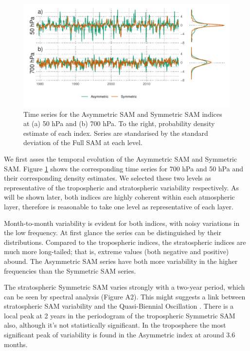 \documentclass[]{ametsocV5}
\begin{document}
\begin{figure}
\includegraphics{asymsam-timeseries-1} \caption[Time series for the Asymmetric SAM and Symmetric SAM indices at (a) 50 hPa and (b) 700 hPa]{Time series for the Asymmetric SAM and Symmetric SAM indices at (a) 50 hPa and (b) 700 hPa. To the right, probability density estimate of each index. Series are standarised by the standard deviation of the Full SAM at each level.}\label{fig:asymsam-timeseries}
\end{figure}

We first asses the temporal evolution of the Asymmetric SAM and Symmetric SAM. Figure \ref{fig:asymsam-timeseries} shows the corresponding time series for 700 hPa and 50 hPa and their corresponding density estimates. We selected these two levels as representative of the tropospheric and stratospheric variability respectively. As will be shown later, both indices are highly coherent within each atmospheric layer, therefore is reasonable to take one level as representative of each layer.

Month-to-month variability is evident for both indices, with noisy variations in the low frequency. At first glance the series can be distinguished by their distributions. Compared to the tropospheric indices, the stratospheric indices are much more long-tailed; that is, extreme values (both negative and positive) abound. The Asymmetric SAM series have both more variability in the higher frequencies than the Symmetric SAM series.

The stratospheric Symmetric SAM varies strongly with a two-year period, which can be seen by spectral analysis (Figure A2). This might suggests a link between stratospheric SAM variability and the Quasi-Biennial Oscillation \citep{baldwin2001b}. There is a local peak at 2 years in the periodogram of the tropospheric Symmetric SAM also, although it's not statistically significant. In the troposphere the most significant peak of variability is found in the Asymmetric index at around 3.6 months.
\end{document}
